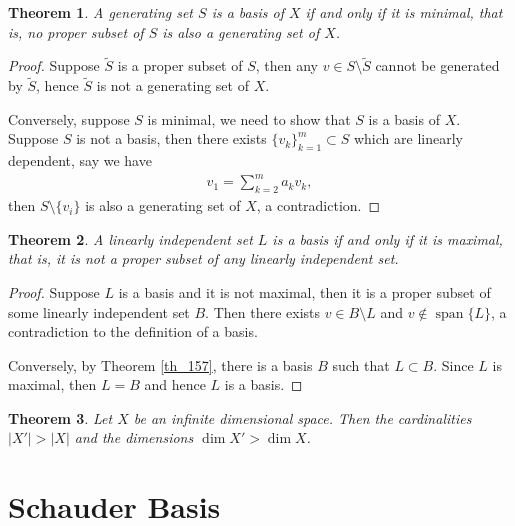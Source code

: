\documentclass[11pt]{book}
\newtheorem{theorem}{Theorem}[chapter]
\theoremstyle{definition}
\numberwithin{equation}{chapter}
\begin{document}
\begin{theorem}
A generating set $S$ is a basis of $X$ if and only if it is minimal, that is, no proper subset of $S$ is also a generating set of $X$.
\end{theorem}
\begin{proof}
Suppose $\widetilde{S}$ is a proper subset of $S$, then any $v \in S\setminus\widetilde{S}$ cannot be generated by $\widetilde{S}$, hence $\widetilde{S}$ is not a generating set of $X$. 

Conversely, suppose $S$ is minimal, we need to show that $S$ is a basis of $X$. Suppose $S$ is not a basis, then there exists $\{v_k\}^m_{k=1} \subset S$ which are linearly dependent, say we have
\begin{align*}
    v_1 = \sum^m_{k=2} a_k v_k,
\end{align*}
then $S \setminus \{v_i\}$ is also a generating set of $X$, a contradiction.
\end{proof}

\medskip

\begin{theorem}
A linearly independent set $L$ is a basis if and only if it is maximal, that is, it is not a proper subset of any linearly independent set.
\end{theorem}
\begin{proof}
Suppose $L$ is a basis and it is not maximal, then it is a proper subset of some linearly independent set $B$. Then there exists $v \in B \setminus L$ and $v \notin \operatorname{span} \{L\}$, a contradiction to the definition of a basis.

Conversely, by Theorem \ref{th_157}, there is a basis $B$ such that $L \subset B$. Since $L$ is maximal, then $L = B$ and hence $L$ is a basis. 
\end{proof}

\medskip

\begin{theorem}
Let $X$ be an infinite dimensional space. Then the cardinalities $\left|X'\right| > \left|X\right|$ and the dimensions $\dim  X' > \dim  X$.
\end{theorem}


\medskip


\section{Schauder Basis}
\end{document}
